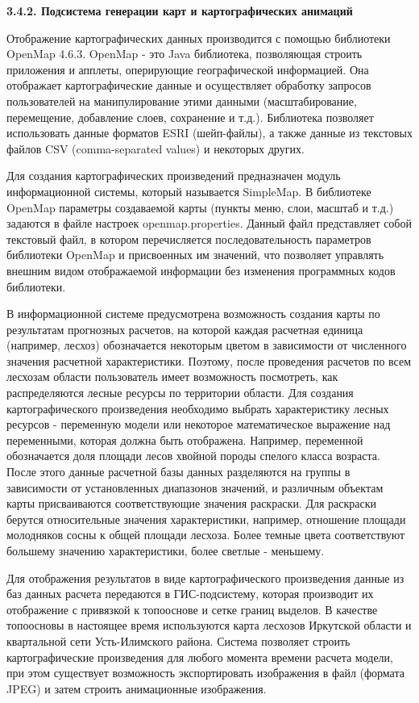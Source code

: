 \documentclass{article}
\begin{document}
\textbf{3.4.2. Подсистема генерации карт и картографических 
анимаций}

Отображение картографических данных производится 
с помощью библиотеки OpenMap 4.6.3. OpenMap - это Java библиотека, 
позволяющая строить приложения и апплеты, оперирующие 
географической информацией. Она отображает 
картографические данные и осуществляет обработку 
запросов пользователей на манипулирование 
этими данными (масштабирование, перемещение, 
добавление слоев, сохранение и т.д.). Библиотека 
позволяет использовать данные форматов ESRI 
(шейп-файлы), а также данные из текстовых файлов 
CSV (comma-separated values) и некоторых других.

Для создания картографических произведений 
предназначен модуль информационной системы, 
который называется SimpleMap. \label{OLEHLINK18}\label{OLEHLINK19}В 
библиотеке OpenMap параметры создаваемой карты 
(пункты меню, слои, масштаб и т.д.) задаются в 
файле настроек openmap.properties. Данный файл представляет 
собой текстовый файл, в котором перечисляется 
последовательность параметров библиотеки 
OpenMap и присвоенных им значений, что позволяет 
управлять внешним видом отображаемой информации 
без изменения программных кодов библиотеки.\label{OLEHLINK4}\label{OLEHLINK5}

В информационной системе предусмотрена возможность 
создания карты по результатам прогнозных расчетов, 
на которой каждая расчетная единица (например, 
лесхоз) обозначается некоторым цветом в зависимости 
от численного значения расчетной характеристики. 
Поэтому, после проведения расчетов по всем 
лесхозам области пользователь имеет возможность 
посмотреть, как распределяются лесные ресурсы 
по территории области. Для создания картографического 
произведения необходимо выбрать характеристику 
лесных ресурсов - переменную модели или некоторое 
математическое выражение над переменными, 
которая должна быть отображена. Например, переменной 
обозначается доля площади лесов хвойной породы 
спелого класса возраста. После этого данные 
расчетной базы данных разделяются на группы 
в зависимости от установленных диапазонов 
значений, и различным объектам карты присваиваются 
соответствующие значения раскраски. Для раскраски 
берутся относительные значения характеристики, 
например, отношение площади молодняков сосны 
к общей площади лесхоза. Более темные цвета 
соответствуют большему значению характеристики, 
более светлые - меньшему.

Для отображения результатов в виде картографического 
произведения данные из баз данных расчета передаются 
в ГИС-подсистему, которая производит их отображение 
с привязкой к топооснове и сетке границ выделов. 
В качестве топоосновы в настоящее время используются 
карта лесхозов Иркутской области и квартальной 
сети Усть-Илимского района. Система позволяет 
строить картографические произведения для 
любого момента времени расчета модели, при 
этом существует возможность экспортировать 
изображения в файл (формата JPEG) и затем строить 
анимационные изображения. 
\end{document}
